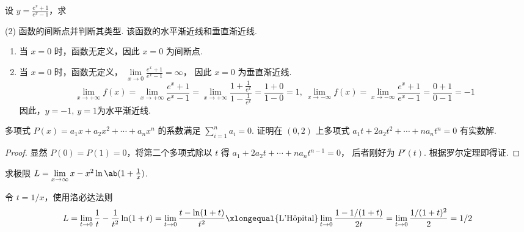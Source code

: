 \begin{problem}[本题6分]
  设 $y = \frac{e^x + 1}{e^x - 1}$，求
  \begin{tasks}[ label = \arabic*. ](2)
    \task 函数的间断点并判断其类型.
    \task 该函数的水平渐近线和垂直渐近线.
  \end{tasks}
\end{problem}
\scratch[24ex]
\begin{solution}\leavevmode
  \begin{enumerate}
    \item 当 $x = 0$ 时，函数无定义，因此 $x = 0$ 为间断点.
    \item 当 $x = 0$ 时，函数无定义，
    $\lim\limits_{x \to 0} \frac{e^x + 1}{e^x - 1} = \infty$，
    因此 $x = 0$ 为垂直渐近线.
    \[
        \lim_{x \to +\infty} f(x) = \lim_{x \to +\infty} \frac{e^x + 1}{e^x - 1}
      = \lim_{x \to +\infty} \frac{1 + \frac{1}{e^x}}{1 - \frac{1}{e^x}}
      = \frac{1 + 0}{1 - 0} = 1,~
        \lim_{x \to -\infty} f(x) = \lim_{x \to -\infty} \frac{e^x + 1}{e^x - 1}
      = \frac{0 + 1}{0 - 1} = -1
    \]
    因此，$y = -1,~ y = 1$为水平渐近线.
  \end{enumerate}
\end{solution}

\begin{problem}[本题7分]
  多项式 $P(x) = a_1x + a_2x^2 + \cdots + a_nx^n$ 的系数满足
  $\sum^n_{i = 1}a_i = 0$.
  证明在 $(0,2)$ 上多项式 $a_1t + 2a_2t^2 + \cdots + na_nt^n = 0$ 有实数解.
\end{problem}
\scratch[10ex]
\begin{solution}
  \begin{proof}
    显然 $P(0) = P(1) = 0$，将第二个多项式除以 $t$ 得
    $a_1 + 2a_2t + \cdots + na_nt^{n - 1} = 0$，
    后者刚好为 $P'(t)$. 根据罗尔定理即得证.
  \end{proof}
\end{solution}

\begin{problem}[本题5分]
  求极限 $L = \lim\limits_{{x \to \infty}}  x - x^2\ln\ab(1 + \frac1x)$.
\end{problem}
\scratch[14ex]
\begin{solution}
  令 $t = 1/x$，使用洛必达法则
  \[
    L = \lim_{t \to 0} \frac1t - \frac{1}{t^2}\ln(1 + t)
      = \lim_{t \to 0} \frac{t - \ln(1 + t)}{t^2}
      \xlongequal{\text{L'Hôpital}} \lim_{t \to 0} \frac{1 - 1/(1 + t)}{2t}
      = \lim_{t \to 0} \frac{1/(1 + t)^2}{2} = 1/2
  \]
\end{solution}

